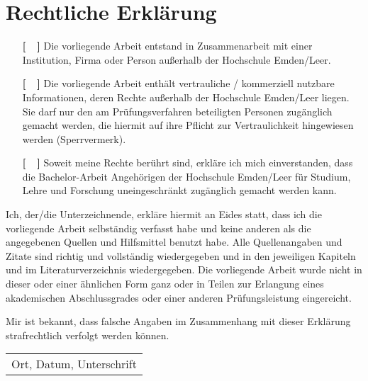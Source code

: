 %
\chapter*{Rechtliche Erklärung}
\label{sec:Declaration} %
%
\vspace{1.5cm}
\begin{itemize}
\item[ {\bf [~~]} ] Die vorliegende Arbeit entstand in Zusammenarbeit mit einer In\-sti\-tution, Firma oder Person außerhalb der Hochschule Emden/Leer.

\item[ {\bf [~~]} ]Die vorliegende Arbeit enthält vertrauliche / kommerziell nutzbare Informationen, deren Rechte außerhalb der Hochschule Emden/Leer liegen. Sie darf nur den am Prüfungsverfahren beteiligten Personen zugänglich gemacht werden, die hiermit auf ihre Pflicht zur Vertraulichkeit hingewiesen werden (Sperrvermerk).

\item[ {\bf [~~]} ] Soweit meine Rechte berührt sind, erkläre ich mich einverstanden, dass die Bachelor-Arbeit Angehörigen der Hochschule Emden/Leer für Studium, Lehre und Forschung uneingeschränkt zugänglich gemacht werden kann. 

\end{itemize}
%
\vspace{1.0cm}

Ich, der/die Unterzeichnende, erkläre hiermit an Eides statt, dass ich die vorliegende 
Arbeit selbständig verfasst habe und keine anderen als die angegebenen Quellen und Hilfsmittel benutzt habe. Alle Quellenangaben und Zitate sind richtig und vollständig wiedergegeben und in den jeweiligen Kapiteln und im Literaturverzeichnis wiedergegeben. Die vorliegende Arbeit wurde nicht in dieser oder einer ähnlichen Form ganz oder in Teilen zur Erlangung eines akademischen Abschlussgrades oder einer anderen Prüfungsleistung eingereicht.

Mir ist bekannt, dass falsche Angaben im Zusammenhang mit dieser Erklärung strafrechtlich verfolgt werden können.

\vspace{2.0cm}

\begin{tabular}{p{5.0cm}}
   \hline
   Ort, Datum, Unterschrift
\end{tabular}
